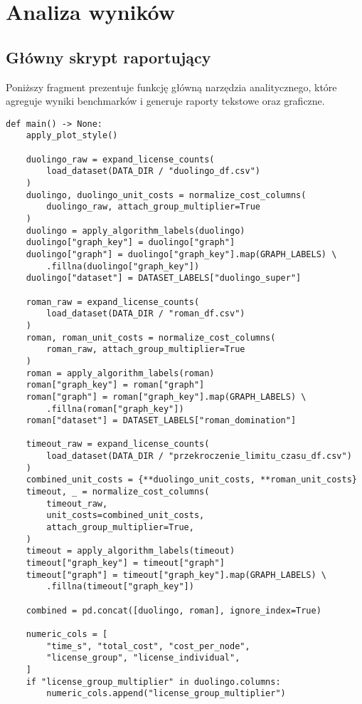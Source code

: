 \section{Analiza wyników}
\subsection{Główny skrypt raportujący}
Poniższy fragment prezentuje funkcję główną narzędzia analitycznego,
które agreguje wyniki benchmarków i generuje raporty tekstowe oraz
graficzne.

\begin{verbatim}
def main() -> None:
    apply_plot_style()

    duolingo_raw = expand_license_counts(
        load_dataset(DATA_DIR / "duolingo_df.csv")
    )
    duolingo, duolingo_unit_costs = normalize_cost_columns(
        duolingo_raw, attach_group_multiplier=True
    )
    duolingo = apply_algorithm_labels(duolingo)
    duolingo["graph_key"] = duolingo["graph"]
    duolingo["graph"] = duolingo["graph_key"].map(GRAPH_LABELS) \
        .fillna(duolingo["graph_key"])
    duolingo["dataset"] = DATASET_LABELS["duolingo_super"]

    roman_raw = expand_license_counts(
        load_dataset(DATA_DIR / "roman_df.csv")
    )
    roman, roman_unit_costs = normalize_cost_columns(
        roman_raw, attach_group_multiplier=True
    )
    roman = apply_algorithm_labels(roman)
    roman["graph_key"] = roman["graph"]
    roman["graph"] = roman["graph_key"].map(GRAPH_LABELS) \
        .fillna(roman["graph_key"])
    roman["dataset"] = DATASET_LABELS["roman_domination"]

    timeout_raw = expand_license_counts(
        load_dataset(DATA_DIR / "przekroczenie_limitu_czasu_df.csv")
    )
    combined_unit_costs = {**duolingo_unit_costs, **roman_unit_costs}
    timeout, _ = normalize_cost_columns(
        timeout_raw,
        unit_costs=combined_unit_costs,
        attach_group_multiplier=True,
    )
    timeout = apply_algorithm_labels(timeout)
    timeout["graph_key"] = timeout["graph"]
    timeout["graph"] = timeout["graph_key"].map(GRAPH_LABELS) \
        .fillna(timeout["graph_key"])

    combined = pd.concat([duolingo, roman], ignore_index=True)

    numeric_cols = [
        "time_s", "total_cost", "cost_per_node",
        "license_group", "license_individual",
    ]
    if "license_group_multiplier" in duolingo.columns:
        numeric_cols.append("license_group_multiplier")


\end{verbatim}
